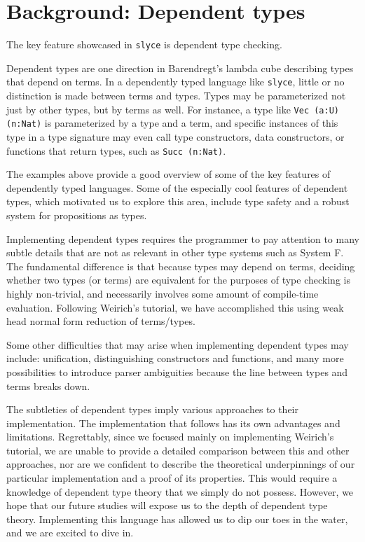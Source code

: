 




\section{Background: Dependent types}
The key feature showcased in \texttt{slyce} is dependent type checking.

Dependent types are one direction in Barendregt's lambda cube describing types
that depend on terms. In a dependently typed language like \texttt{slyce},
little or no distinction is made between terms and types. Types may be
parameterized not just by other types, but by terms as well. For instance, a
type like \texttt{Vec (a:U) (n:Nat)} is parameterized by a type and a term, and specific instances
of this type in a type signature may even call type constructors, data
constructors, or functions that return types, such as \texttt{Succ (n:Nat)}.

The examples above
provide a good overview of some of the key features of dependently typed
languages. Some of the especially cool features of dependent types, which
motivated us to explore this area, include type safety and a robust system for
propositions as types.

Implementing dependent types requires the programmer to pay attention to many
subtle details that are not as relevant in other type systems such as System F.
The fundamental difference is that because types may depend on terms,
deciding whether two types (or terms) are equivalent for the purposes of type
checking is highly non-trivial, and necessarily involves some amount of
compile-time evaluation. Following Weirich's tutorial, we have accomplished
this using weak head normal form reduction of terms/types.

Some other difficulties that may arise when implementing dependent types may
include: unification, distinguishing constructors and functions, and many more
possibilities to introduce parser ambiguities because the line between types
and terms breaks down.

The subtleties of dependent types imply various approaches to their
implementation. The implementation that follows has its own advantages and
limitations. Regrettably, since
we focused mainly on implementing Weirich's tutorial, we are unable to provide
a detailed comparison between this and other approaches, nor are we confident
to describe the theoretical underpinnings of our particular implementation and
a proof of its properties. This would require a knowledge of dependent type
theory that we simply do not possess. However,
we hope that our future studies will expose us to the depth of dependent type
theory. Implementing this language has allowed us to dip our toes in the water,
and we are excited to dive in.

